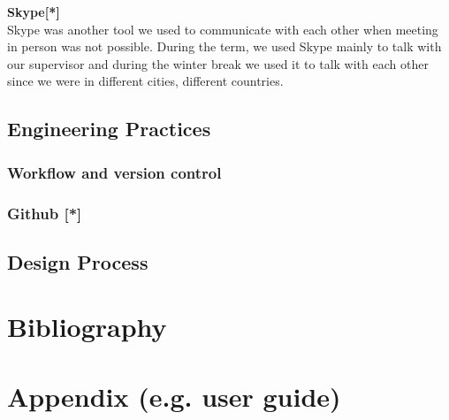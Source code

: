 \documentclass{article}
\begin{document}
\textbf{Skype[*] }\\
Skype was another tool we used to communicate with each other when meeting in person was not possible. During the term, we used Skype mainly to talk with our supervisor and during the winter break we used it to talk with each other since we were in different cities, different countries. \\


\subsection{Engineering Practices}
\subsubsection{Workflow and version control}
	

\subsubsection{Github [*]}

\subsection{Design Process}
	
	
	
	


\newpage

\section{Bibliography}  

\newpage

\section{Appendix (e.g. user guide)}
\end{document}
